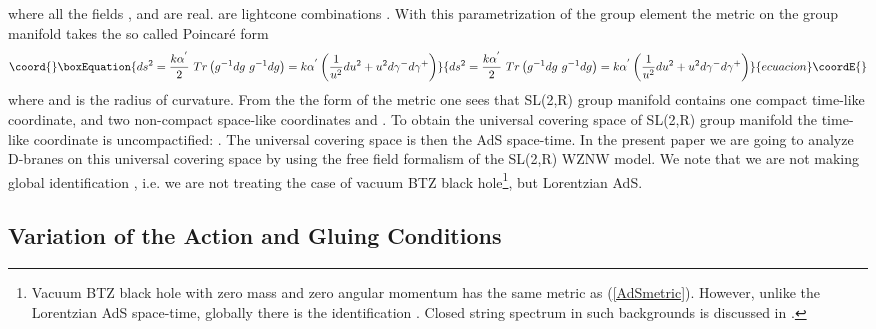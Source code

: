 \documentclass[a4paper,12pt]{article}
\begin{document}
where all the fields \coordHE{}, \coordHE{} and \coordHE{} are real. \coordHE{} are lightcone combinations \coordHE{}. With this parametrization of the group element the metric on the
group manifold takes the so called Poincar\'{e} form
\begin{equation}\coord{}\boxEquation{
ds^{2}=\frac{k\alpha ^{^{\prime }}}{2}\ Tr\left( g^{-1}dg\ g^{-1}dg\right)
=k\alpha ^{^{\prime }}\left( \frac{1}{u^{2}}du^{2}+u^{2}d\gamma ^{-}d\gamma
^{+}\right)  \label{AdSmetric}
}{
ds^{2}=\frac{k\alpha ^{^{\prime }}}{2}\ Tr\left( g^{-1}dg\ g^{-1}dg\right)
=k\alpha ^{^{\prime }}\left( \frac{1}{u^{2}}du^{2}+u^{2}d\gamma ^{-}d\gamma
^{+}\right)  }{ecuacion}\coordE{}\end{equation}
where \coordHE{} and \coordHE{} is the radius of curvature. From the the form of the metric
one sees that SL(2,R) group manifold contains one compact time-like
coordinate, \coordHE{} and two non-compact space-like
coordinates \myHighlight{$x\in \left] -\infty ,\infty \right[ $}\coordHE{} and \myHighlight{$u\in \left[ 0,\infty
\right[ $}\coordHE{}. To obtain the universal covering space of SL(2,R) group manifold
the time-like coordinate is uncompactified: \myHighlight{$t\in \left] -\infty ,\infty
\right[ $}\coordHE{}. The universal covering space is then the AdS\coordHE{} space-time. In
the present paper we are going to analyze D-branes on this universal
covering space by using the free field formalism of the SL(2,R) WZNW
model. We note that we are not making global identification \coordHE{}%
, i.e. we are not treating the case of vacuum BTZ black hole\footnote{%
Vacuum BTZ black hole with zero mass and zero angular momentum has the same
metric as (\ref{AdSmetric}). However, unlike the Lorentzian AdS\coordHE{}
space-time, globally there is the identification \coordHE{}. Closed
string spectrum in such backgrounds is discussed in \cite{troost}.}, but
Lorentzian AdS\coordHE{}.

\subsection{Variation of the Action and Gluing Conditions}
\end{document}
